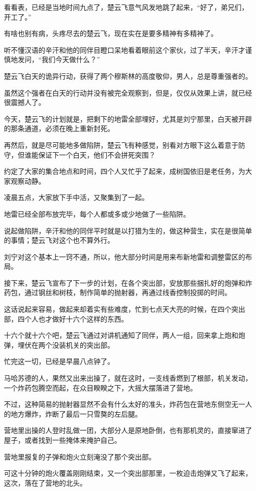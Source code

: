 看看表，已经是当地时间九点了，楚云飞意气风发地跳了起来，“好了，弟兄们，开工了。”

有啥也别有病，头疼尽去的楚云飞，现在实在是要多精神有多精神了。

听不懂汉语的辛汗和他的同伴目瞪口呆地看着眼前这个家伙，过了半天，辛汗才谨慎地发问，“我们今天做什么？”

楚云飞白天的诡异行动，获得了两个穆斯林的高度敬仰，男人，总是尊重强者的。

虽然这个强者在白天的行动并没有被完全观察到，但是，仅仅从效果上讲，就已经很震撼人了。

今天，楚云飞的计划就是，把剩下的地雷全部埋好，尤其是刘宁那里，白天被开辟的那条通道，必须在晚上重新封死。

再然后，就是尽可能地多做陷阱，楚云飞有种感觉，别看对方眼下这么着意于防守，但谁能保证下一个白天，他们不会拼死突围？

约定了大家的集合地点和时间，四个人又忙乎了起来，成树国依旧是老任务，为大家观察动静。

凌晨五点，大家放下手中活，又聚集到了一起。

地雷已经全部布放完毕，每个人都或多或少地做了一些陷阱。

说起做陷阱，辛汗和他的同伴平时就是以打猎为生的，做这种营生，实在是很简单的事情；楚云飞对这个也不算外行。

刘宁对这个基本上一窍不通，所以，他大部分时间是用来布新地雷和调整雷区的布局。

接下来，楚云飞宣布了下一步的计划，在各个突出部，安放那些捆扎好的炮弹和炸药包，通过钢丝和树枝，制作简单的抛射器，再通过线香控制投掷的时间。

这话说起来容易，做起来却着实有些难度，忙到七点天大亮的时候，在四个突出部，四个人也才做好十六个这样的东西。

十六个就十六个吧，楚云飞通过对讲机通知了同伴，两人一组，回来拿上炮和炮弹，埋伏在两个没装机关的突出部。

忙完这一切，已经是早晨八点钟了。

马哈苏德的人，果然又出来出操了，就在这时，一支线香燃到了根部，机关发动，一个炸药包腾空而起，在众目睽睽之下，大摇大摆落进了营地。

不过，这种简易的抛射器显然不会有什么太好的准头，炸药包在营地东侧空无一人的地方爆炸，炸断了最后一只雪獒的左后腿。

营地里出操的人登时乱做一团，大部分人是原地卧倒，也有那机灵的，直接窜进了屋子，或者找到一些掩体来掩护自己。

营地里报复的子弹和炮火立刻淹没了那个突出部。

可这十分钟的炮火覆盖刚刚结束，又一个突出部那里，一枚迫击炮弹又飞了起来，这次，落在了营地的北头。

